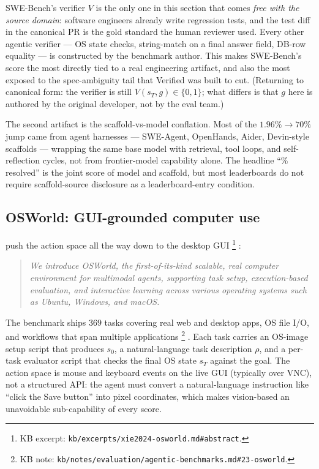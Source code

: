 \begin{intuition}
SWE-Bench's verifier $V$ is the only one in this section that comes
\emph{free with the source domain}: software engineers already write
regression tests, and the test diff in the canonical PR is the gold
standard the human reviewer used. Every other agentic verifier ---
OS state checks, string-match on a final answer field, DB-row
equality --- is constructed by the benchmark author. This makes
SWE-Bench's score the most directly tied to a real engineering
artifact, and also the most exposed to the spec-ambiguity tail that
Verified was built to cut. (Returning to canonical form: the verifier
is still $V(s_T, g) \in \{0, 1\}$; what differs is that $g$ here is
authored by the original developer, not by the eval team.)
\end{intuition}

The second artifact is the scaffold-vs-model conflation. Most of the
$1.96\% \to 70\%$ jump came from agent harnesses --- SWE-Agent,
OpenHands, Aider, Devin-style scaffolds --- wrapping the same base
model with retrieval, tool loops, and self-reflection cycles, not
from frontier-model capability alone. The headline ``\% resolved'' is
the joint score of model and scaffold, but most leaderboards do not
require scaffold-source disclosure as a leaderboard-entry condition.

\subsection{OSWorld: GUI-grounded computer use}
\label{sec:agentic-osworld}

\citet{xie2024-osworld} push the action space all the way down to the
desktop GUI%
\footnote{KB excerpt: \texttt{kb/excerpts/xie2024-osworld.md\#abstract}.}
\citep[\S{}abstract]{xie2024-osworld}:

\begin{quote}\itshape
We introduce OSWorld, the first-of-its-kind scalable, real computer
environment for multimodal agents, supporting task setup, execution-based
evaluation, and interactive learning across various operating systems
such as Ubuntu, Windows, and macOS.
\end{quote}

The benchmark ships $369$ tasks covering real web and desktop apps,
OS file I/O, and workflows that span multiple applications%
\footnote{KB note: \texttt{kb/notes/evaluation/agentic-benchmarks.md\#23-osworld}.}
\citep[\S{}abstract]{xie2024-osworld}. Each task carries an OS-image
setup script that produces $s_0$, a natural-language task description
$\rho$, and a per-task evaluator script that checks the final OS
state $s_T$ against the goal. The action space is mouse and keyboard
events on the live GUI (typically over VNC), not a structured API:
the agent must convert a natural-language instruction like ``click
the Save button'' into pixel coordinates, which makes vision-based
 an unavoidable sub-capability of every score.


